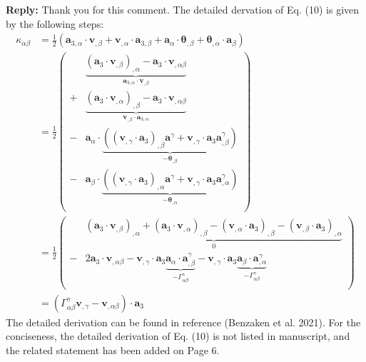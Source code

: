 \documentclass{article}
\begin{document}
\textbf{Reply:} Thank you for this comment. The detailed dervation of Eq. (10) is given by the following steps:
\begin{equation}
    \begin{split}
        \kappa_{\alpha\beta} &=\frac{1}{2}(\boldsymbol a_{3,\alpha} \cdot \boldsymbol v_{,\beta} + \boldsymbol v_{,\alpha} \cdot \boldsymbol a_{3,\beta} + \boldsymbol a_\alpha \cdot \boldsymbol \theta_{,\beta} + \boldsymbol \theta_{,\alpha} \cdot \boldsymbol a_\beta) \\
        &=\frac{1}{2} \left ( 
        \begin{split}
            &\underbrace{(\boldsymbol a_3 \cdot \boldsymbol v_{,\beta})_{,\alpha} - \boldsymbol a_3 \cdot \boldsymbol v_{,\alpha\beta}}_{\boldsymbol a_{3,\alpha} \cdot \boldsymbol v_{,\beta}} \\
            +&\underbrace{(\boldsymbol a_3 \cdot \boldsymbol v_{,\alpha})_{,\beta} - \boldsymbol a_3 \cdot \boldsymbol v_{,\alpha\beta}}_{\boldsymbol v_{,\beta} \cdot \boldsymbol a_{3,\alpha}} \\
            -& \boldsymbol a_\alpha \cdot \underbrace{((\boldsymbol v_{,\gamma} \cdot \boldsymbol a_3)_{,\beta} \boldsymbol a^\gamma + \boldsymbol v_{,\gamma} \cdot \boldsymbol a_3 \boldsymbol a^\gamma_{,\beta})}_{-\boldsymbol \theta_{,\beta}} \\
            -& \boldsymbol a_\beta \cdot \underbrace{((\boldsymbol v_{,\gamma} \cdot \boldsymbol a_3)_{,\alpha} \boldsymbol a^\gamma + \boldsymbol v_{,\gamma} \cdot \boldsymbol a_3 \boldsymbol a^\gamma_{,\alpha})}_{-\boldsymbol \theta_{,\alpha}} \\
        \end{split}
        \right ) \\
        &=\frac{1}{2} \left ( 
        \begin{split}
            &\underbrace{(\boldsymbol a_3 \cdot \boldsymbol v_{,\beta})_{,\alpha}
            +(\boldsymbol a_3 \cdot \boldsymbol v_{,\alpha})_{,\beta}
            -(\boldsymbol v_{,\alpha} \cdot \boldsymbol a_3)_{,\beta}
            -(\boldsymbol v_{,\beta} \cdot \boldsymbol a_3)_{,\alpha}}_{0} \\
            -&2\boldsymbol a_3 \cdot \boldsymbol v_{,\alpha\beta}
            - \boldsymbol v_{,\gamma} \cdot \boldsymbol a_3 \underbrace{\boldsymbol a_\alpha \cdot \boldsymbol a^\gamma_{,\beta}}_{-\Gamma_{\alpha\beta}^\gamma}
            - \boldsymbol v_{,\gamma} \cdot \boldsymbol a_3 \underbrace{\boldsymbol a_\beta \cdot \boldsymbol a^\gamma_{,\alpha}}_{-\Gamma_{\alpha\beta}^\gamma} \\
        \end{split}
        \right ) \\
        &= (\Gamma_{\alpha\beta}^\gamma \boldsymbol v_{,\gamma} - \boldsymbol v_{,\alpha\beta}) \cdot \boldsymbol a_3
    \end{split}
\end{equation}
The detailed derivation can be found in reference (Benzaken et al. 2021). For the conciseness, the detailed derivation of Eq. (10) is not listed in manuscript, and the related statement has been added on Page 6.
\end{document}
